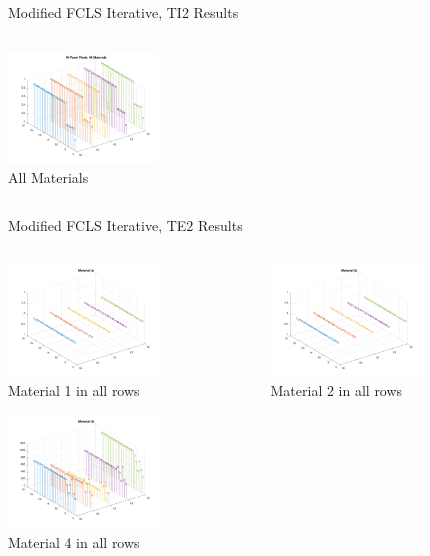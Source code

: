 \documentclass{beamer}
\begin{document}
\begin{frame}{Modified FCLS Iterative, TI2 Results}
\begin{columns}
\begin{column}{0.33\textwidth}
        \includegraphics[width=4cm,center]{mfcls_ti2_allmaterials}
        \\ All Materials
        \centering
    \end{column}
\end{columns}
\end{frame}

\begin{frame}{Modified FCLS Iterative, TE2 Results}
\begin{columns}
    \begin{column}{0.33\textwidth}
        \includegraphics[width=4cm,center]{mfcls_te2_material_stem_1}
        \\ Material 1 in all rows
        \centering

        \includegraphics[width=4cm,center]{mfcls_te2_material_stem_4}
        \\ Material 4 in all rows
        \centering
    \end{column}
    \begin{column}{0.33\textwidth}
        \includegraphics[width=4cm,center]{mfcls_te2_material_stem_2}
        \\ Material 2 in all rows
        \centering


\end{column}
\end{columns}
\end{frame}
\end{document}
